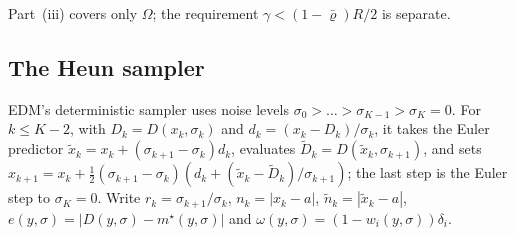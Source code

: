 \documentclass{article} %
\theoremstyle{plain}
\theoremstyle{definition}
\theoremstyle{remark}
\begin{document}
Part~(iii) covers only $\Omega$; the requirement $\gamma<(1-\bar\varrho)R/2$ is separate.

\subsection{The Heun sampler}
\label{apx:pf-heun}

EDM's deterministic sampler uses noise levels $\sigma_0>\dots>\sigma_{K-1}>\sigma_K=0$. For
$k\le K-2$, with $D_k=D(x_k,\sigma_k)$ and $d_k=(x_k-D_k)/\sigma_k$, it takes the Euler predictor
$\tilde x_k=x_k+(\sigma_{k+1}-\sigma_k)d_k$, evaluates $\tilde D_k=D(\tilde x_k,\sigma_{k+1})$, and sets
$x_{k+1}=x_k+\tfrac12(\sigma_{k+1}-\sigma_k)(d_k+(\tilde x_k-\tilde D_k)/\sigma_{k+1})$; the last step
is the Euler step to $\sigma_K=0$. Write $r_k=\sigma_{k+1}/\sigma_k$, $n_k=|x_k-a|$,
$\tilde n_k=|\tilde x_k-a|$, $e(y,\sigma)=|D(y,\sigma)-m^\star(y,\sigma)|$ and
$\omega(y,\sigma)=(1-w_i(y,\sigma))\delta_i$.
\end{document}
